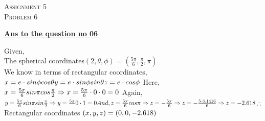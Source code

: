 \documentclass{article}
\begin{document}
\begin{newpage}
    \begin{flushright}
    \textsc{Assignment 5}\\
    \textsc{Problem 6}\\
    [1 cm]
    \end{flushright}
\begin{center}
  \textbf{\Large \underline {Ans to the question no 06}}\\
  [0.5 cm]
\end{center}
\Large {Given, \\[3mm]
The spherical coordinates$ (2,\theta,\phi)=(\frac{5\pi}{6}, \frac{\pi}{2},\pi)$\\[3mm]
We know in terms of rectangular coordinates,\\[3mm]
$x=e\cdot sin\phi cos\theta\\[3mm]
y=e\cdot sin\phi sin\theta\\[3mm]
z=e \cdot cos\phi\\[3mm]$
Here,\\[3mm]
$x=\frac{5\pi}{6} sin\pi cos\frac{\pi}{2}\\[3mm]
\Rightarrow x=\frac{5\pi}{6} \cdot 0\cdot 0=0\\[3mm]$
Again,\\[3mm]
$y=\frac{5\pi}{6}sin\pi sin\frac{\pi}{2}\\[3mm]
\Rightarrow y=\frac{5\pi} \cdot 0 \cdot 1=0\\[3mm]
And, z=\frac{5\pi}{6} cos\pi\\[3mm]
\Rightarrow z=-\frac{5\pi}{6}\\[3mm]
\Rightarrow z=-\frac{5\cdot 3.1416}{6}\\[3mm]
\Rightarrow z=-2.618\\[3mm]\\[3mm]
\therefore$ Rectangular coordinates $(x,y,z)=(0,0,-2.618)\\[3mm]$}
\end{newpage}
\end{document}
